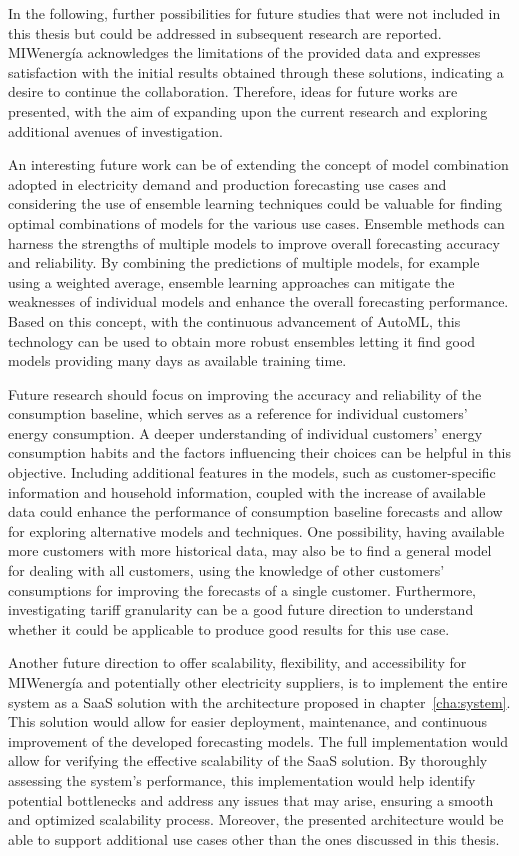 In the following, further possibilities for future studies that were not included in this thesis but could be addressed in subsequent research are reported.
MIWenergía acknowledges the limitations of the provided data and expresses satisfaction with the initial results obtained through these solutions, indicating a desire to continue the collaboration.
Therefore, ideas for future works are presented, with the aim of expanding upon the current research and exploring additional avenues of investigation.

An interesting future work can be of extending the concept of model combination adopted in electricity demand and production forecasting use cases and considering the use of ensemble learning techniques could be valuable for finding optimal combinations of models for the various use cases.
Ensemble methods can harness the strengths of multiple models to improve overall forecasting accuracy and reliability.
By combining the predictions of multiple models, for example using a weighted average, ensemble learning approaches can mitigate the weaknesses of individual models and enhance the overall forecasting performance.
Based on this concept, with the continuous advancement of AutoML, this technology can be used to obtain more robust ensembles letting it find good models providing many days as available training time.

Future research should focus on improving the accuracy and reliability of the consumption baseline, which serves as a reference for individual customers' energy consumption.
A deeper understanding of individual customers' energy consumption habits and the factors influencing their choices can be helpful in this objective.
Including additional features in the models, such as customer-specific information and household information, coupled with the increase of available data could enhance the performance of consumption baseline forecasts and allow for exploring alternative models and techniques.
One possibility, having available more customers with more historical data, may also be to find a general model for dealing with all customers, using the knowledge of other customers' consumptions for improving the forecasts of a single customer.
Furthermore, investigating tariff granularity can be a good future direction to understand whether it could be applicable to produce good results for this use case.

Another future direction to offer scalability, flexibility, and accessibility for MIWenergía and potentially other electricity suppliers, is to implement the entire system as a SaaS solution with the architecture proposed in chapter~\ref{cha:system}.
This solution would allow for easier deployment, maintenance, and continuous improvement of the developed forecasting models.
The full implementation would allow for verifying the effective scalability of the SaaS solution.
By thoroughly assessing the system's performance, this implementation would help identify potential bottlenecks and address any issues that may arise, ensuring a smooth and optimized scalability process.
Moreover, the presented architecture would be able to support additional use cases other than the ones discussed in this thesis.

